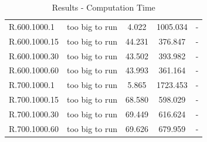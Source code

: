 \documentclass[]{article}
\begin{document}
\begin{table}[htb]
\begin{tabular}{lcccc}
			R.600.1000.1  & too big to run & 4.022         & 1005.034    & -             \\
			R.600.1000.15 & too big to run & 44.231        & 376.847     & -             \\
			R.600.1000.30 & too big to run & 43.502        & 393.982     & -             \\
			R.600.1000.60 & too big to run & 43.993        & 361.164     & -             \\
			R.700.1000.1  & too big to run & 5.865         & 1723.453    & -             \\
			R.700.1000.15 & too big to run & 68.580        & 598.029     & -             \\
			R.700.1000.30 & too big to run & 69.449        & 616.624     & -             \\
			R.700.1000.60 & too big to run & 69.626        & 679.959     & -             \\
		\end{tabular}
		\caption{Results - Computation Time}
		\label{table:results_time}
	\end{table}





    \newpage

	 
	
\end{document}
